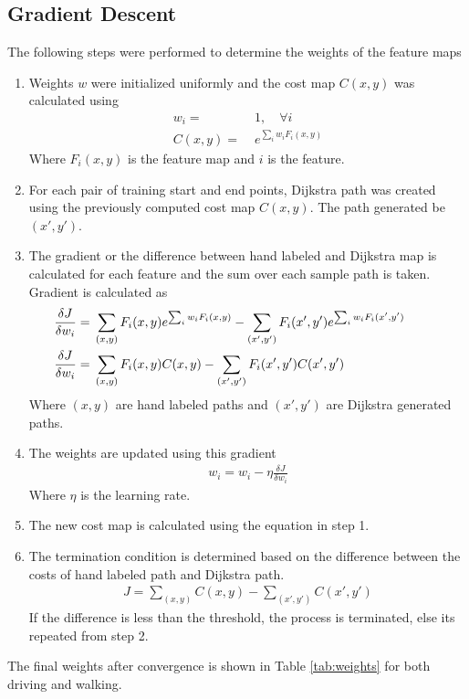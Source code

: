 \documentclass[fleqn,10pt]{SelfArx} %
\begin{document}
\subsection{Gradient Descent}
The following steps were performed to determine the weights of the feature maps
\begin{enumerate}
\item Weights $w$ were initialized uniformly and the cost map $C(x,y)$ was calculated using
\begin{align*}
w_i =&\; 1, \quad \forall i \\
C(x,y) =&\; e^{\sum_i w_i F_i(x,y)}
\end{align*}
Where $F_i(x,y)$ is the feature map and $i$ is the feature.
\item For each pair of training start and end points, Dijkstra path was created using the previously computed cost map $C(x,y)$. The path generated be $(x',y')$.
\item The gradient or the difference between hand labeled and Dijkstra map is calculated for each feature and the sum over each sample path is taken. Gradient is calculated as
\begin{align*}
\hspace{-1cm}
\frac{\delta J}{\delta w_i} =&\; \sum_{(x,y)} F_i(x,y) e^{\sum_i w_i F_i(x,y)} - \sum_{(x',y')} F_i(x',y') e^{\sum_i w_i F_i(x',y')} \\
\hspace{-1cm}
\frac{\delta J}{\delta w_i} =&\; \sum_{(x,y)} F_i(x,y) C(x,y) - \sum_{(x',y')} F_i(x',y') C(x',y') 
\end{align*}
Where $(x,y)$ are hand labeled paths and $(x',y')$ are Dijkstra generated paths.
\item The weights are updated using this gradient
\begin{align*}
w_i = w_i - \eta \frac{\delta J}{\delta w_i}
\end{align*}
Where $\eta$ is the learning rate.
\item The new cost map is calculated using the equation in step 1.
\item The termination condition is determined based on the difference between the costs of hand labeled path and Dijkstra path.
\begin{align*}
J = \sum_{(x,y)} C(x,y) - \sum_{(x',y')} C(x',y')
\end{align*}
If the difference is less than the threshold, the process is terminated, else its repeated from step 2.
\end{enumerate}
The final weights after convergence is shown in Table \ref{tab:weights} for both driving and walking.
\end{document}
